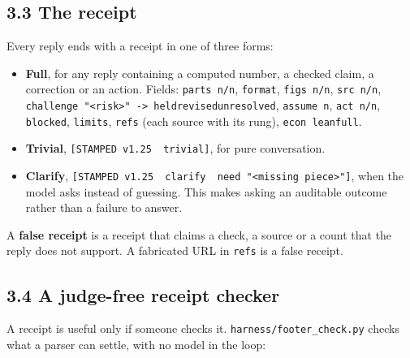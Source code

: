 \documentclass[
  11pt,
]{article}
\providecommand{\tightlist}{%
  \setlength{\itemsep}{0pt}\setlength{\parskip}{0pt}}
\begin{document}
\hypertarget{the-receipt}{%
\subsection{3.3 The receipt}\label{the-receipt}}

Every reply ends with a receipt in one of three forms:

\begin{itemize}
\tightlist
\item
  \textbf{Full}, for any reply containing a computed number, a checked
  claim, a correction or an action. Fields: \texttt{parts\ n/n},
  \texttt{format}, \texttt{figs\ n/n}, \texttt{src\ n/n},
  \texttt{challenge\ "\textless{}risk\textgreater{}"\ -\textgreater{}\ held\textbar{}revised\textbar{}unresolved},
  \texttt{assume\ n}, \texttt{act\ n/n}, \texttt{blocked},
  \texttt{limits}, \texttt{refs} (each source with its rung),
  \texttt{econ\ lean\textbar{}full}.
\item
  \textbf{Trivial}, \texttt{{[}STAMPED\ v1.25\ \textbar{}\ trivial{]}},
  for pure conversation.
\item
  \textbf{Clarify},
  \texttt{{[}STAMPED\ v1.25\ \textbar{}\ clarify\ \textbar{}\ need\ "\textless{}missing\ piece\textgreater{}"{]}},
  when the model asks instead of guessing. This makes asking an
  auditable outcome rather than a failure to answer.
\end{itemize}

A \textbf{false receipt} is a receipt that claims a check, a source or a
count that the reply does not support. A fabricated URL in \texttt{refs}
is a false receipt.

\hypertarget{a-judge-free-receipt-checker}{%
\subsection{3.4 A judge-free receipt
checker}\label{a-judge-free-receipt-checker}}

A receipt is useful only if someone checks it.
\texttt{harness/footer\_check.py} checks what a parser can settle, with
no model in the loop:
\end{document}
